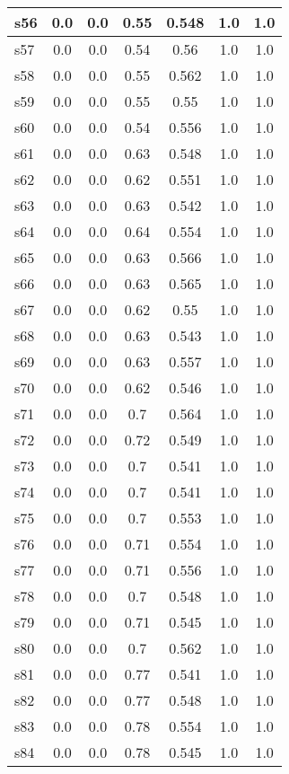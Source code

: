 \documentclass{article}
\begin{document}
\begin{tabular}{|l|c|c|c|c|c|c|}
\hline
s56 &0.0 & 0.0 & 0.55 & 0.548 & 1.0 & 1.0\\
\hline
s57 &0.0 & 0.0 & 0.54 & 0.56 & 1.0 & 1.0\\
\hline
s58 &0.0 & 0.0 & 0.55 & 0.562 & 1.0 & 1.0\\
\hline
s59 &0.0 & 0.0 & 0.55 & 0.55 & 1.0 & 1.0\\
\hline
s60 &0.0 & 0.0 & 0.54 & 0.556 & 1.0 & 1.0\\
\hline
s61 &0.0 & 0.0 & 0.63 & 0.548 & 1.0 & 1.0\\
\hline
s62 &0.0 & 0.0 & 0.62 & 0.551 & 1.0 & 1.0\\
\hline
s63 &0.0 & 0.0 & 0.63 & 0.542 & 1.0 & 1.0\\
\hline
s64 &0.0 & 0.0 & 0.64 & 0.554 & 1.0 & 1.0\\
\hline
s65 &0.0 & 0.0 & 0.63 & 0.566 & 1.0 & 1.0\\
\hline
s66 &0.0 & 0.0 & 0.63 & 0.565 & 1.0 & 1.0\\
\hline
s67 &0.0 & 0.0 & 0.62 & 0.55 & 1.0 & 1.0\\
\hline
s68 &0.0 & 0.0 & 0.63 & 0.543 & 1.0 & 1.0\\
\hline
s69 &0.0 & 0.0 & 0.63 & 0.557 & 1.0 & 1.0\\
\hline
s70 &0.0 & 0.0 & 0.62 & 0.546 & 1.0 & 1.0\\
\hline
s71 &0.0 & 0.0 & 0.7 & 0.564 & 1.0 & 1.0\\
\hline
s72 &0.0 & 0.0 & 0.72 & 0.549 & 1.0 & 1.0\\
\hline
s73 &0.0 & 0.0 & 0.7 & 0.541 & 1.0 & 1.0\\
\hline
s74 &0.0 & 0.0 & 0.7 & 0.541 & 1.0 & 1.0\\
\hline
s75 &0.0 & 0.0 & 0.7 & 0.553 & 1.0 & 1.0\\
\hline
s76 &0.0 & 0.0 & 0.71 & 0.554 & 1.0 & 1.0\\
\hline
s77 &0.0 & 0.0 & 0.71 & 0.556 & 1.0 & 1.0\\
\hline
s78 &0.0 & 0.0 & 0.7 & 0.548 & 1.0 & 1.0\\
\hline
s79 &0.0 & 0.0 & 0.71 & 0.545 & 1.0 & 1.0\\
\hline
s80 &0.0 & 0.0 & 0.7 & 0.562 & 1.0 & 1.0\\
\hline
s81 &0.0 & 0.0 & 0.77 & 0.541 & 1.0 & 1.0\\
\hline
s82 &0.0 & 0.0 & 0.77 & 0.548 & 1.0 & 1.0\\
\hline
s83 &0.0 & 0.0 & 0.78 & 0.554 & 1.0 & 1.0\\
\hline
s84 &0.0 & 0.0 & 0.78 & 0.545 & 1.0 & 1.0\\

\end{tabular}
\end{document}
